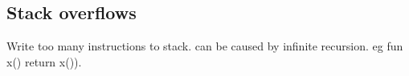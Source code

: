 

\subsection{Stack overflows}

Write too many instructions to stack. can be caused by infinite recursion. eg fun x() return x()).


